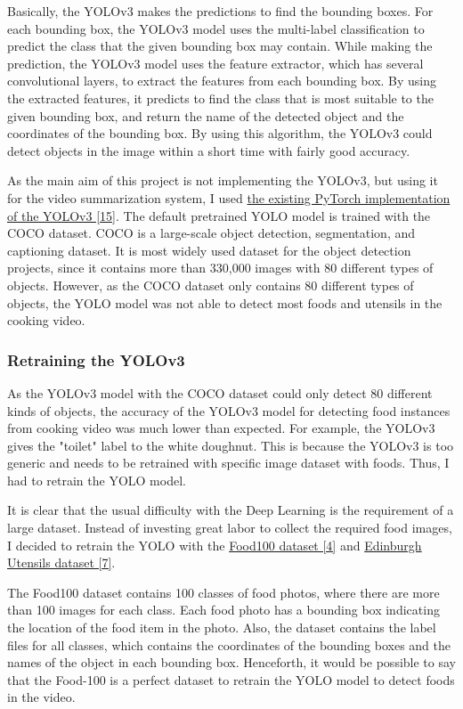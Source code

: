 \documentclass{article}
\begin{document}
Basically, the YOLOv3 makes the predictions to find the bounding boxes. For each bounding box, the YOLOv3 model uses the multi-label classification to predict the class that the given bounding box may contain. While making the prediction, the YOLOv3 model uses the feature extractor, which has several convolutional layers, to extract the features from each bounding box. By using the extracted features, it predicts to find the class that is most suitable to the given bounding box, and return the name of the detected object and the coordinates of the bounding box. By using this algorithm, the YOLOv3 could detect objects in the image within a short time with fairly good accuracy.

As the main aim of this project is not implementing the YOLOv3, but using it for the video summarization system, I used \hyperlink{ref15}{the existing PyTorch implementation of the YOLOv3 [15]}. The default pretrained YOLO model is trained with the COCO dataset. COCO is a large-scale object detection, segmentation, and captioning dataset. It is most widely used dataset for the object detection projects, since it contains more than 330,000 images with 80 different types of objects. However, as the COCO dataset only contains 80 different types of objects, the YOLO model was not able to detect most foods and utensils in the cooking video.

\subsubsection{Retraining the YOLOv3}

As the YOLOv3 model with the COCO dataset could only detect 80 different kinds of objects, the accuracy of the YOLOv3 model for detecting food instances from cooking video was much lower than expected. For example, the YOLOv3 gives the "toilet" label to the white doughnut. This is because the YOLOv3 is too generic and needs to be retrained with specific image dataset with foods. Thus, I had to retrain the YOLO model.

It is clear that the usual difficulty with the Deep Learning is the requirement of a large dataset. Instead of investing great labor to collect the required food images, I decided to retrain the YOLO with the \hyperlink{ref4}{Food100 dataset [4]} and \hyperlink{ref7}{Edinburgh Utensils dataset [7]}.

The Food100 dataset contains 100 classes of food photos, where there are more than 100 images for each class. Each food photo has a bounding box indicating the location of the food item in the photo. Also, the dataset contains the label files for all classes, which contains the coordinates of the bounding boxes and the names of the object in each bounding box. Henceforth, it would be possible to say that the Food-100 is a perfect dataset to retrain the YOLO model to detect foods in the video.
\end{document}
